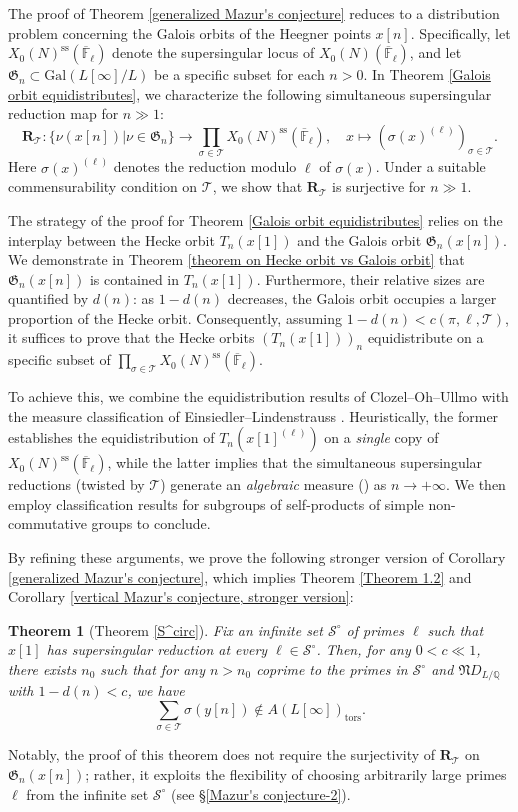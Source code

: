 \documentclass[11pt,oneside,reqno]{amsart}
\newcommand{\Gal}{\mathrm{Gal}}
\newcommand{\ssrm}{\mathrm{ss}}
\newcommand{\F}{\mathbb{F}}
\newcommand{\Q}{\mathbb{Q}}
\newcommand{\Scal}{\mathcal{S}}
\newcommand{\Tcal}{\mathcal{T}}
\newcommand{\Rbf}{\mathbf{R}}
\newcommand{\Gfrak}{\mathfrak{G}}
\newcommand{\Nfrak}{\mathfrak{N}}
\theoremstyle{plain}
\newtheorem{theorem}{Theorem}[section]
\begin{document}
	The proof of Theorem \ref{generalized Mazur's conjecture} reduces to a distribution problem concerning the Galois orbits of the Heegner points $x[n]$. Specifically, let $X_0(N)^\ssrm(\overline{\F}_\ell)$ denote the supersingular locus of $X_0(N)(\overline{\F}_\ell)$, and let $\Gfrak_n \subset \Gal(L[\infty]/L)$ be a specific subset for each $n>0$. In Theorem \ref{Galois orbit equidistributes}, we characterize the following simultaneous supersingular reduction map for $n\gg 1$:
	\[
	\Rbf_{\Tcal}\colon
	\{\nu(x[n])|\nu\in\Gfrak_n\}\to
	\prod_{\sigma\in\Tcal}X_0(N)^\ssrm(\overline{\F}_\ell),
	\quad
	x\mapsto(\sigma(x)^{(\ell)})_{\sigma\in\Tcal}.
	\]
	Here $\sigma(x)^{(\ell)}$ denotes the reduction modulo $\ell$ of $\sigma(x)$. Under a suitable commensurability condition on $\Tcal$, we show that $\Rbf_{\Tcal}$ is surjective for $n\gg 1$.
	
	The strategy of the proof for Theorem \ref{Galois orbit equidistributes} relies on the interplay between the Hecke orbit $T_n(x[1])$ and the Galois orbit $\Gfrak_n(x[n])$. We demonstrate in Theorem \ref{theorem on Hecke orbit vs Galois orbit} that $\Gfrak_n(x[n])$ is contained in $T_n(x[1])$. Furthermore, their relative sizes are quantified by $d(n)$: as $1-d(n)$ decreases, the Galois orbit occupies a larger proportion of the Hecke orbit. Consequently, assuming $1-d(n)<c(\pi,\ell,\Tcal)$, it suffices to prove that the Hecke orbits $(T_n(x[1]))_n$ equidistribute on a specific subset of $\prod_{\sigma\in\Tcal} X_0(N)^\ssrm(\overline{\F}_\ell)$.
	
	To achieve this, we combine the equidistribution results of Clozel--Oh--Ullmo \cite{ClozelOhUllmo2001} with the measure classification of Einsiedler--Lindenstrauss \cite{EinsiedlerLindenstrauss2019}. Heuristically, the former establishes the equidistribution of $T_n(x[1]^{(\ell)})$ on a \emph{single} copy of $X_0(N)^\ssrm(\overline{\F}_\ell)$, while the latter implies that the simultaneous supersingular reductions (twisted by $\Tcal$) generate an \emph{algebraic} measure (\cite[Definition 1.2]{EinsiedlerLindenstrauss2019}) as $n\to+\infty$. We then employ classification results for subgroups of self-products of simple non-commutative groups to conclude.
	
	By refining these arguments, we prove the following stronger version of Corollary \ref{generalized Mazur's conjecture}, which implies Theorem \ref{Theorem 1.2} and Corollary \ref{vertical Mazur's conjecture, stronger version}:
	
	\begin{theorem}[Theorem \ref{S^circ}]
		Fix an infinite set $\Scal^\circ$ of primes $\ell$ such that $x[1]$ has supersingular reduction at every $\ell \in \Scal^\circ$. Then, for any $0<c\ll1$, there exists $n_0$ such that for any $n>n_0$ coprime to the primes in $\Scal^\circ$ and $\Nfrak D_{L/\Q}$ with $1-d(n)<c$, we have
		\[
		\sum_{\sigma\in\Tcal}\sigma(y[n])\notin
		A(L[\infty])_\mathrm{tors}.
		\]
	\end{theorem}
	Notably, the proof of this theorem does not require the surjectivity of $\Rbf_{\Tcal}$ on $\Gfrak_n(x[n])$; rather, it exploits the flexibility of choosing arbitrarily large primes $\ell$ from the infinite set $\Scal^\circ$ (see §\ref{Mazur's conjecture-2}).
	
\end{document}
